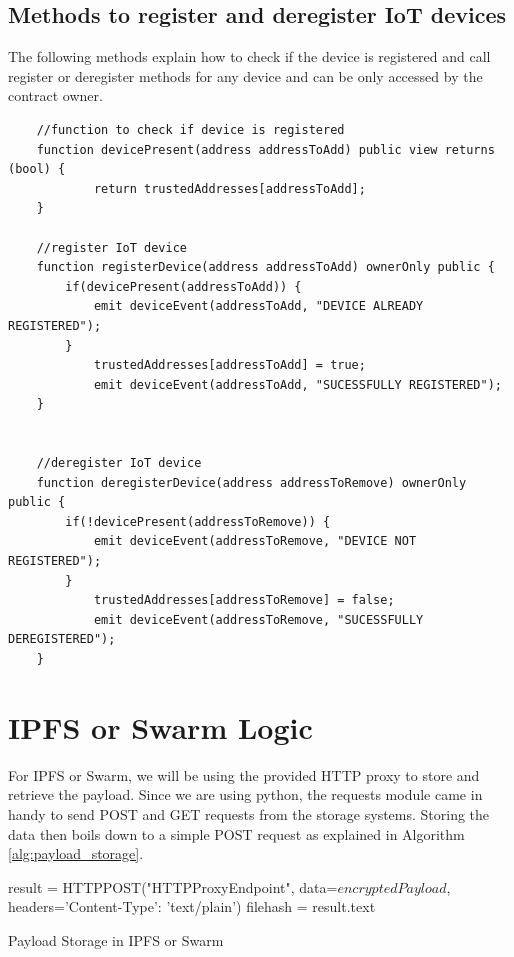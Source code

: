 \documentclass[11pt,openright]{report}
\begin{document}
\subsection{Methods to register and deregister IoT devices}
The following methods explain how to check if the device is registered and call register or deregister methods for any device and can be only accessed by the contract owner.
\begin{verbatim}
    //function to check if device is registered
    function devicePresent(address addressToAdd) public view returns (bool) {
            return trustedAddresses[addressToAdd];
    }
    
    //register IoT device
    function registerDevice(address addressToAdd) ownerOnly public {
        if(devicePresent(addressToAdd)) {
            emit deviceEvent(addressToAdd, "DEVICE ALREADY REGISTERED");
        }
            trustedAddresses[addressToAdd] = true;
            emit deviceEvent(addressToAdd, "SUCESSFULLY REGISTERED");
    }
    
    
    //deregister IoT device
    function deregisterDevice(address addressToRemove) ownerOnly public {
        if(!devicePresent(addressToRemove)) {
            emit deviceEvent(addressToRemove, "DEVICE NOT REGISTERED");
        }
            trustedAddresses[addressToRemove] = false;
            emit deviceEvent(addressToRemove, "SUCESSFULLY DEREGISTERED");
    }
\end{verbatim}
\newpage

\section{IPFS or Swarm Logic}

For IPFS or Swarm, we will be using the provided HTTP proxy to store and retrieve the payload. Since we are using python, the requests module came in handy to send POST and GET requests from the storage systems. Storing the data then boils down to a simple POST request as explained in Algorithm \ref{alg:payload_storage}.

\begin{algorithm}[setSwarmOrIPFSData]
  result = HTTPPOST("HTTPProxyEndpoint", data=$encryptedPayload$, headers={'Content-Type': 'text/plain'})\;
  filehash = result.text\;
 \caption{Payload Storage in IPFS or Swarm}
 \label{alg:payload_storage}
\end{algorithm}
\end{document}
